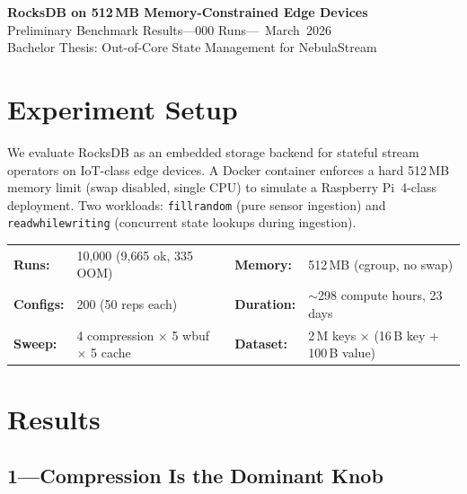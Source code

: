 \documentclass[10pt,a4paper]{scrartcl}
\begin{document}
\begin{center}
  {\Large\bfseries\color{headerblue} RocksDB on 512\,MB Memory-Constrained Edge Devices}\\[5pt]
  {\normalsize Preliminary Benchmark Results\enspace---000 Runs\enspace---~March~2026}\\[2pt]
  {\small\color{footergray} Bachelor Thesis: Out-of-Core State Management for NebulaStream}
\end{center}
\vspace{-1mm}

\section{Experiment Setup}

We evaluate RocksDB as an embedded storage backend for stateful stream operators
on IoT-class edge devices. A Docker container enforces a hard 512\,MB memory
limit (swap disabled, single CPU) to simulate a Raspberry Pi~4-class deployment.
Two workloads: \texttt{fillrandom} (pure sensor ingestion) and
\texttt{readwhilewriting} (concurrent state lookups during ingestion).

\smallskip
\begin{tabular}{@{}ll@{\qquad}ll@{}}
  \textbf{Runs:}     & 10{,}000 (9{,}665 ok, 335 OOM) &
  \textbf{Memory:}   & 512\,MB (cgroup, no swap) \\
  \textbf{Configs:}  & 200 (50 reps each) &
  \textbf{Duration:} & $\sim$298 compute hours, 23 days \\
  \textbf{Sweep:}    & 4 compression $\times$ 5 wbuf $\times$ 5 cache &
  \textbf{Dataset:}  & 2\,M keys $\times$ (16\,B key + 100\,B value) \\
\end{tabular}

\section{Results}

\subsection{1\enspace---\enspace Compression Is the Dominant Knob}
\end{document}
